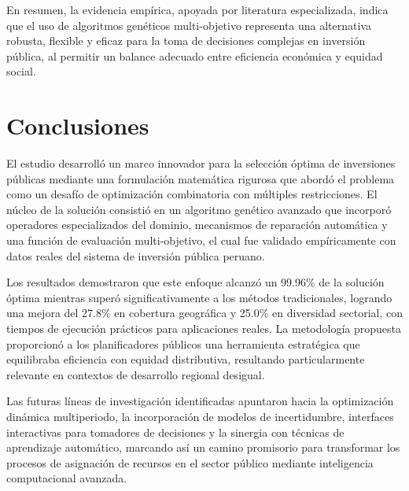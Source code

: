 \documentclass[12pt,a4paper]{article}
\begin{document}
En resumen, la evidencia empírica, apoyada por literatura especializada, indica que el uso de algoritmos genéticos multi-objetivo representa una alternativa robusta, flexible y eficaz para la toma de decisiones complejas en inversión pública, al permitir un balance adecuado entre eficiencia económica y equidad social.



\section{Conclusiones}

El estudio desarrolló un marco innovador para la selección óptima de inversiones públicas mediante una formulación matemática rigurosa que abordó el problema como un desafío de optimización combinatoria con múltiples restricciones. El núcleo de la solución consistió en un algoritmo genético avanzado que incorporó operadores especializados del dominio, mecanismos de reparación automática y una función de evaluación multi-objetivo, el cual fue validado empíricamente con datos reales del sistema de inversión pública peruano. 

Los resultados demostraron que este enfoque alcanzó un 99.96\% de la solución óptima mientras superó significativamente a los métodos tradicionales, logrando una mejora del 27.8\% en cobertura geográfica y 25.0\% en diversidad sectorial, con tiempos de ejecución prácticos para aplicaciones reales. La metodología propuesta proporcionó a los planificadores públicos una herramienta estratégica que equilibraba eficiencia con equidad distributiva, resultando particularmente relevante en contextos de desarrollo regional desigual.

Las futuras líneas de investigación identificadas apuntaron hacia la optimización dinámica multiperiodo, la incorporación de modelos de incertidumbre, interfaces interactivas para tomadores de decisiones y la sinergia con técnicas de aprendizaje automático, marcando así un camino promisorio para transformar los procesos de asignación de recursos en el sector público mediante inteligencia computacional avanzada.
\end{document}
